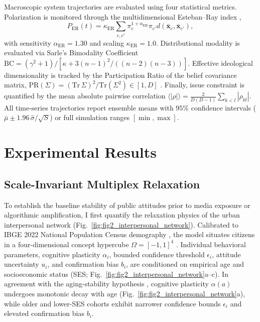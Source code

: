 \documentclass[a4paper,fleqn]{cas-dc}
\begin{document}
Macroscopic system trajectories are evaluated using four statistical metrics. Polarization is monitored through the multidimensional Esteban--Ray index \citep{esteban1994measurement},
\begin{equation}
    P_{\mathrm{ER}}(t) = \kappa_{\mathrm{ER}} \sum_{c, c'} \pi_c^{1 + \alpha_{\mathrm{ER}}} \pi_{c'} d(\bar{\mathbf{x}}_c, \bar{\mathbf{x}}_{c'}),
    \label{eq:er_index}
\end{equation}
with sensitivity $\alpha_{\mathrm{ER}} = 1.30$ and scaling $\kappa_{\mathrm{ER}} = 1.0$. Distributional modality is evaluated via Sarle's Bimodality Coefficient $\mathrm{BC} = (\gamma^2 + 1) / [\kappa + 3 (n-1)^2 / ((n-2)(n-3))]$. Effective ideological dimensionality is tracked by the Participation Ratio of the belief covariance matrix, $\mathrm{PR}(\Sigma) = (\mathrm{Tr}\,\Sigma)^2 / \mathrm{Tr}(\Sigma^2) \in [1, D]$ \citep{roy1953useful}. Finally, issue constraint is quantified by the mean absolute pairwise correlation $\langle |\rho| \rangle = \frac{2}{D(D-1)} \sum_{k < l} |\rho_{kl}|$. All time-series trajectories report ensemble means with $95\%$ confidence intervals ($\bar{\mu} \pm 1.96\,\hat{\sigma}/\sqrt{S}$) or full simulation ranges $[\min, \max]$.

\section{Experimental Results}
\label{sec:results}

\subsection{Scale-Invariant Multiplex Relaxation}
\label{subsec:results_baseline}
To establish the baseline stability of public attitudes prior to media exposure or algorithmic amplification, I first quantify the relaxation physics of the urban interpersonal network (Fig.~\ref{fig:fig2_interpersonal_network}). Calibrated to IBGE 2022 National Population Census demography \citep{ibge2022censo}, the model situates citizens in a four-dimensional concept hypercube $\Omega = [-1, 1]^4$ \citep{converse1964nature}. Individual behavioral parameters, cognitive plasticity $\alpha_i$, bounded confidence threshold $\epsilon_i$, attitude uncertainty $u_i$, and confirmation bias $b_i$, are conditioned on empirical age and socioeconomic status (SES; Fig.~\ref{fig:fig2_interpersonal_network}a--c). In agreement with the aging-stability hypothesis \citep{alwin1991aging, kiley2020measuring}, cognitive plasticity $\alpha(a)$ undergoes monotonic decay with age (Fig.~\ref{fig:fig2_interpersonal_network}a), while older and lower-SES cohorts exhibit narrower confidence bounds $\epsilon_i$ and elevated confirmation bias $b_i$.
\end{document}
